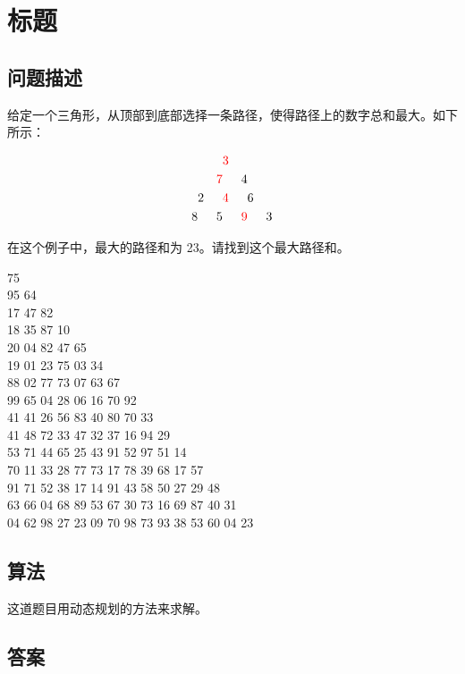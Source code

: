 \section{标题}
\subsection{问题描述}
\begin{tcolorbox}
	给定一个三角形，从顶部到底部选择一条路径，使得路径上的数字总和最大。如下所示：

	\[
		\begin{aligned}
			  &   &                    & \textcolor{red}{3} &                    &   &   \\
			  &   & \textcolor{red}{7} &                    & 4                  &   &   \\
			  & 2 &                    & \textcolor{red}{4} &                    & 6 &   \\
			8 &   & 5                  &                    & \textcolor{red}{9} &   & 3
		\end{aligned}
	\]

	在这个例子中，最大的路径和为 23。请找到这个最大路径和。

	\begin{center}
		75\\
		95 64\\
		17 47 82\\
		18 35 87 10\\
		20 04 82 47 65\\
		19 01 23 75 03 34\\
		88 02 77 73 07 63 67\\
		99 65 04 28 06 16 70 92\\
		41 41 26 56 83 40 80 70 33\\
		41 48 72 33 47 32 37 16 94 29\\
		53 71 44 65 25 43 91 52 97 51 14\\
		70 11 33 28 77 73 17 78 39 68 17 57\\
		91 71 52 38 17 14 91 43 58 50 27 29 48\\
		63 66 04 68 89 53 67 30 73 16 69 87 40 31\\
		04 62 98 27 23 09 70 98 73 93 38 53 60 04 23\\
	\end{center}
\end{tcolorbox}

\subsection{算法}
这道题目用动态规划的方法来求解。

\subsection{答案}
